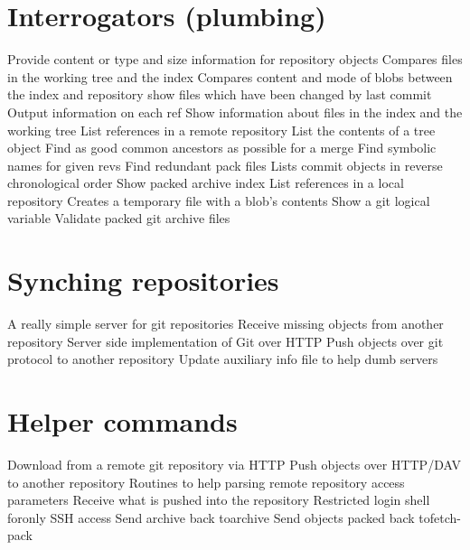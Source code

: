 \section{Interrogators (plumbing)}{}
	{Provide content or type and size information for repository objects}
	{Compares files in the working tree and the index}
	{Compares content and mode of blobs between the index and repository}
	{show files which have been changed by last commit}
	{Output information on each ref}
	{Show information about files in the index and the working tree}
	{List references in a remote repository}
	{List the contents of a tree object}
	{Find as good common ancestors as possible for a merge}
	{Find symbolic names for given revs}
	{Find redundant pack files}
	{Lists commit objects in reverse chronological order}
	{Show packed archive index}
	{List references in a local repository}
	{Creates a temporary file with a blob’s contents}
	{Show a git logical variable}
	{Validate packed git archive files}

\section{Synching repositories}{}
	{A really simple server for git repositories}
	{Receive missing objects from another repository}
	{Server side implementation of Git over HTTP}
	{Push objects over git protocol to another repository}
	{Update auxiliary info file to help dumb servers}

\section{Helper commands}{}
	{Download from a remote git repository via HTTP}
	{Push objects over HTTP/DAV to another repository}
	{Routines to help parsing remote repository access parameters}
	{Receive what is pushed into the repository}
	{Restricted login shell foronly SSH access}
	{Send archive back toarchive}
	{Send objects packed back tofetch-pack}

